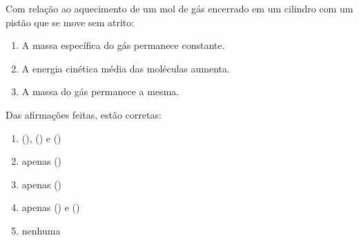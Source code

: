 Com relação ao aquecimento de um mol de gás  encerrado em um cilindro com um pistão que se move sem atrito:

\begin{enumerate}[label = (\scaleroman{\roman*})]
	\item A massa específica do gás permanece constante.
	\item A energia cinética média das moléculas aumenta.
	\item A massa do gás permanece a mesma.
\end{enumerate}

Das afirmações feitas, estão corretas:

\begin{enumerate}[label = (\scalealph{\alph*})]
	\item (), () e ()
	\item apenas ()
	\item apenas ()
	\item apenas () e ()
	\item nenhuma
\end{enumerate}

